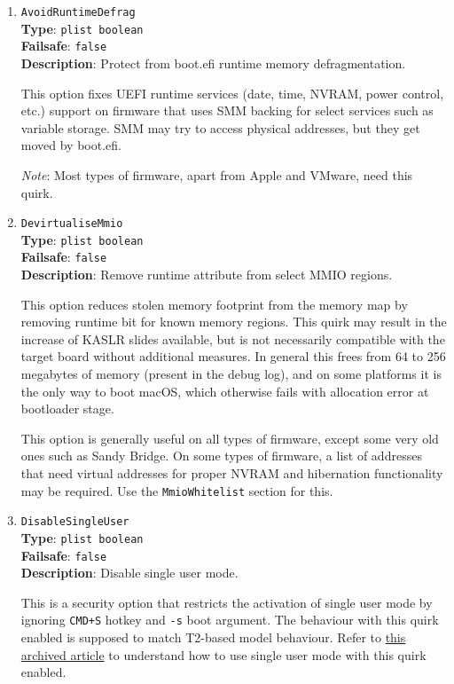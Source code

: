 \documentclass[]{article}
\begin{document}
\begin{enumerate}

\item
  \texttt{AvoidRuntimeDefrag}\\
  \textbf{Type}: \texttt{plist\ boolean}\\
  \textbf{Failsafe}: \texttt{false}\\
  \textbf{Description}: Protect from boot.efi runtime memory defragmentation.

  This option fixes UEFI runtime services (date, time, NVRAM, power control, etc.)
  support on firmware that uses SMM backing for select services such as variable
  storage. SMM may try to access physical addresses, but they get moved by boot.efi.

  \emph{Note}: Most types of firmware, apart from Apple and VMware, need this quirk.

\item
  \texttt{DevirtualiseMmio}\\
  \textbf{Type}: \texttt{plist\ boolean}\\
  \textbf{Failsafe}: \texttt{false}\\
  \textbf{Description}: Remove runtime attribute from select MMIO regions.

  This option reduces stolen memory footprint from the memory map by removing
  runtime bit for known memory regions. This quirk may result in the increase
  of KASLR slides available, but is not necessarily compatible with the target
  board without additional measures. In general this frees from 64 to 256
  megabytes of memory (present in the debug log), and on some platforms it
  is the only way to boot macOS, which otherwise fails with allocation
  error at bootloader stage.

  This option is generally useful on all types of firmware, except some very old ones
  such as Sandy Bridge. On some types of firmware, a list of addresses that need virtual
  addresses for proper NVRAM and hibernation functionality may be required.
  Use the \texttt{MmioWhitelist} section for this.

\item
  \texttt{DisableSingleUser}\\
  \textbf{Type}: \texttt{plist\ boolean}\\
  \textbf{Failsafe}: \texttt{false}\\
  \textbf{Description}: Disable single user mode.

  This is a security option that restricts the activation of single user mode
  by ignoring \texttt{CMD+S} hotkey and \texttt{-s} boot argument. The
  behaviour with this quirk enabled is supposed to match T2-based model
  behaviour. Refer to \href{https://web.archive.org/web/20200517125051/https://support.apple.com/en-us/HT201573}{this archived article} to understand how to use single user mode with this quirk enabled.


\end{enumerate}
\end{document}
